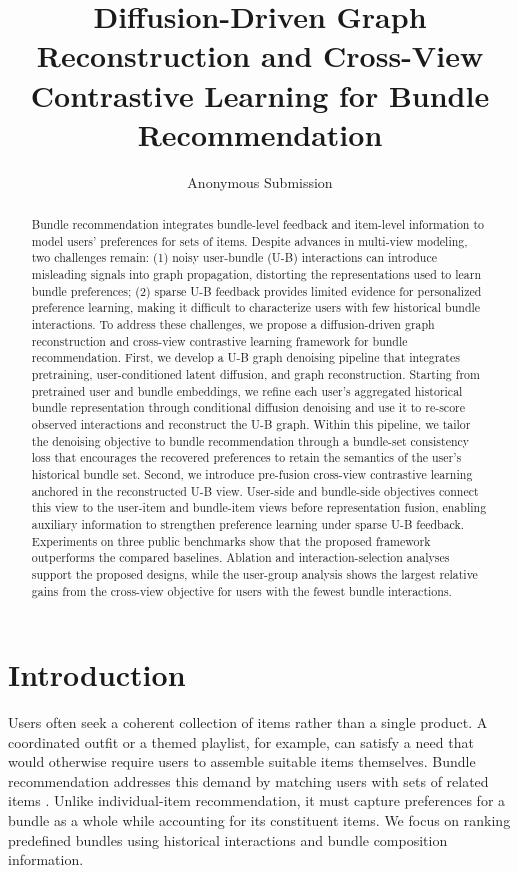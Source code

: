 \documentclass[letterpaper]{article}
\title{Diffusion-Driven Graph Reconstruction and Cross-View Contrastive Learning for Bundle Recommendation}
\author{
Anonymous Submission
}
\begin{document}
\maketitle


\begin{abstract}
Bundle recommendation integrates bundle-level feedback and item-level information to model users' preferences for sets of items. Despite advances in multi-view modeling, two challenges remain: (1) noisy user-bundle (U-B) interactions can introduce misleading signals into graph propagation, distorting the representations used to learn bundle preferences; (2) sparse U-B feedback provides limited evidence for personalized preference learning, making it difficult to characterize users with few historical bundle interactions. To address these challenges, we propose a diffusion-driven graph reconstruction and cross-view contrastive learning framework for bundle recommendation. First, we develop a U-B graph denoising pipeline that integrates pretraining, user-conditioned latent diffusion, and graph reconstruction. Starting from pretrained user and bundle embeddings, we refine each user's aggregated historical bundle representation through conditional diffusion denoising and use it to re-score observed interactions and reconstruct the U-B graph. Within this pipeline, we tailor the denoising objective to bundle recommendation through a bundle-set consistency loss that encourages the recovered preferences to retain the semantics of the user's historical bundle set. Second, we introduce pre-fusion cross-view contrastive learning anchored in the reconstructed U-B view. User-side and bundle-side objectives connect this view to the user-item and bundle-item views before representation fusion, enabling auxiliary information to strengthen preference learning under sparse U-B feedback. Experiments on three public benchmarks show that the proposed framework outperforms the compared baselines. Ablation and interaction-selection analyses support the proposed designs, while the user-group analysis shows the largest relative gains from the cross-view objective for users with the fewest bundle interactions.
\end{abstract}


\section{Introduction}

Users often seek a coherent collection of items rather than a single product. A coordinated outfit or a themed playlist, for example, can satisfy a need that would otherwise require users to assemble suitable items themselves. Bundle recommendation addresses this demand by matching users with sets of related items \cite{ma2022crosscbr,sun2024intent}. Unlike individual-item recommendation, it must capture preferences for a bundle as a whole while accounting for its constituent items. We focus on ranking predefined bundles using historical interactions and bundle composition information.
\end{document}
